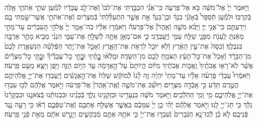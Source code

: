 \documentclass[twoside, openany, parskip=half, 11pt]{book}
\begin{document}
\begin{sometimes}
\begin{footnotesize}
\begin{multicols}{2}
\\
וַיֹּ֤אמֶר יְיָ֙ אֶל־מֹשֶׁ֔ה בֹּ֖א אֶל־פַּרְעֹ֑ה כִּֽי־אֲנִ֞י הִכְבַּ֤דְתִּי אֶת־לִבּוֹ֙ וְֿאֶת־לֵ֣ב עֲבָדָ֔יו לְֿמַ֗עַן שִׁתִ֛י אֹֽתֹתַ֥י אֵ֖לֶּה בְּֿקִרְבּֽוֹ׃ וּלְמַ֡עַן תְּֿסַפֵּר֩ בְּֿאָזְֿנֵ֨י בִנְךָ֜ וּבֶן־בִּנְךָ֗ אֵ֣ת אֲשֶׁ֤ר הִתְעַלַּ֨לְתִּי֙ בְּֿמִצְרַ֔יִם וְֿאֶת־אֹֽתֹתַ֖י אֲשֶׁר־שַׂ֣מְתִּי בָ֑ם וִֽידַעְתֶּ֖ם כִּֽי־אֲנִ֥י יְיָ׃ וַיָּבֹ֨א מֹשֶׁ֣ה וְֿאַֽהֲרֹן֘ אֶל־פַּרְעֹה֒ וַיֹּֽאמְֿר֣וּ אֵלָ֗יו כֹּֽה־אָמַ֤ר יְיָ֙ אֱלֹהֵ֣י הָֽעִבְרִ֔ים עַד־מָתַ֣י מֵאַ֔נְתָּ לֵֽעָנֹ֖ת מִפָּנָ֑י שַׁלַּ֥ח עַמִּ֖י וְֿיַֽעַבְדֻֽנִי׃  כִּ֛י אִם־מָאֵ֥ן אַתָּ֖ה לְֿשַׁלֵּ֣חַ אֶת־עַמִּ֑י הִנְנִ֨י מֵבִ֥יא מָחָ֛ר אַרְבֶּ֖ה בִּגְבֻלֶֽךָ׃ וְֿכִסָּה֙ אֶת־עֵ֣ין הָאָ֔רֶץ וְֿלֹ֥א יוּכַ֖ל לִרְאֹ֣ת אֶת־הָאָ֑רֶץ וְֿאָכַ֣ל אֶת־יֶ֣תֶר הַפְּֿלֵטָ֗ה הַנִּשְׁאֶ֤רֶת לָכֶם֙ מִן־הַבָּרָ֔ד וְֿאָכַל֙ אֶת־כׇּל־הָעֵ֔ץ הַצֹּמֵ֥חַ לָכֶ֖ם מִן־הַשָּׂדֶֽה׃ וּמָֽלְֿא֨וּ בׇׇׇׇׇׇׇׇׇׇָתֶּ֜יךָ וּבׇׇׇׇׇׇָתֵּ֣י כׇל־עֲבָדֶ֘יךָ֘ וּבׇׇׇׇׇׇָתֵּ֣י כׇל־מִצְרַ֒יִם֒ אֲשֶׁ֨ר לֹֽא־רָא֤וּ אֲבֹתֶ֨יךָ֙ וַֽאֲב֣וֹת אֲבֹתֶ֔יךָ מִיּ֗וֹם הֱיוֹתָם֙ עַל־הָ֣אֲדָמָ֔ה עַ֖ד הַיּ֣וֹם הַזֶּ֑ה וַיִּ֥פֶן וַיֵּצֵ֖א מֵעִ֥ם פַּרְעֹֽה׃  וַיֹּֽאמְֿרוּ֩ עַבְדֵ֨י פַרְעֹ֜ה אֵלָ֗יו עַד־מָתַי֙ יִהְיֶ֨ה זֶ֥ה לָ֨נוּ֙ לְֿמוֹקֵ֔שׁ שַׁלַּח֙ אֶת־הָ֣אֲנָשִׁ֔ים וְֿיַֽעַבְד֖וּ אֶת־יְיָ֣ אֱלֹֽהֵיהֶ֑ם הֲטֶ֣רֶם תֵּדַ֔ע כִּ֥י אָֽבְֿדָ֖ה מִצְרָֽיִם׃ וַיּוּשַׁ֞ב אֶת־מֹשֶׁ֤ה וְֿאֶֽת־אַֽהֲרֹן֙ אֶל־פַּרְעֹ֔ה וַיֹּ֣אמֶר אֲלֵהֶ֔ם לְֿכ֥וּ עִבְד֖וּ אֶת־יְיָ֣ אֱלֹֽהֵיכֶ֑ם מִ֥י וָמִ֖י הַהֹֽלְֿכִֽים׃ וַיֹּ֣אמֶר מֹשֶׁ֔ה בִּנְעָרֵ֥ינוּ וּבִזְקֵנֵ֖ינוּ נֵלֵ֑ךְ בְּֿבָנֵ֨ינוּ וּבִבְנוֹתֵ֜נוּ בְּֿצֹאנֵ֤נוּ וּבִבְקָרֵ֨נוּ֙ נֵלֵ֔ךְ כִּ֥י חַג־יְיָ֖ לָֽנוּ׃ וַיֹּ֣אמֶר אֲלֵהֶ֗ם יְֿהִ֨י כֵ֤ן יְיָ֙ עִמָּכֶ֔ם כַּֽאֲשֶׁ֛ר אֲשַׁלַּ֥ח אֶתְכֶ֖ם וְֿאֶֽת־טַפְּֿכֶ֑ם רְֿא֕וּ כִּ֥י רָעָ֖ה נֶ֥גֶד פְּֿנֵיכֶֽם׃ לֹ֣א כֵ֗ן לְֿכוּ־נָ֤א הַגְּֿבָרִים֙ וְֿעִבְד֣וּ אֶת־יְיָ֔ כִּ֥י אֹתָ֖הּ אַתֶּ֣ם מְֿבַקְשִׁ֑ים וַיְגָ֣רֶשׁ אֹתָ֔ם מֵאֵ֖ת פְּֿנֵ֥י פַרְעֹֽה׃



\end{multicols}
\end{footnotesize}
\end{sometimes}
\end{document}

